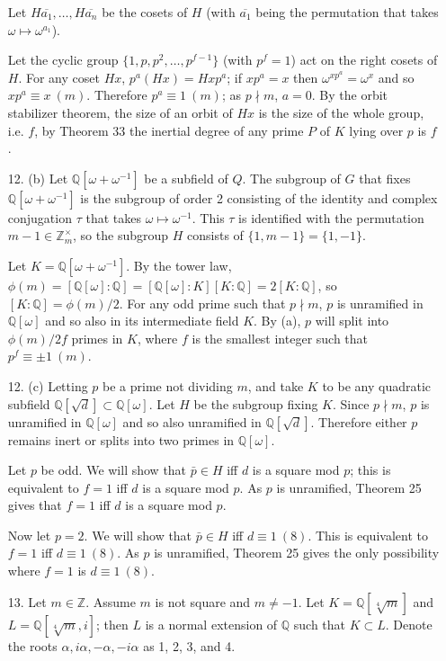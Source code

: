 \documentclass{article}
\newcommand{\w}[0]{\omega}
\newcommand{\Q}[0]{\mathbb{Q}}
\newcommand{\Z}[0]{\mathbb{Z}}
\newcommand{\modequiv}[3]{#1 \equiv #2\ (#3)}
\begin{document}
\begin{enumerate}
Let $H\overline{a_1}, \ldots, H\overline{a_n}$ be the cosets of $H$ (with $\overline{a_1}$ being the permutation that takes $\w \mapsto \w^{a_1}$).

Let the cyclic group $\{1, p, p^2, \ldots, p^{f-1} \}$ (with $p^{f} = 1$) act on the right cosets of $H$.  For any coset $Hx$, $p^{a}(Hx) = Hxp^{a}$; if $xp^{a} = x$ then $\w^{xp^{a}} = \w^{x}$ and so $\modequiv{xp^{a}}{x}{m}$.  Therefore $\modequiv{p^a}{1}{m}$; as $p \nmid m$, $a = 0$.  By the orbit stabilizer theorem, the size of an orbit of $Hx$ is the size of the whole group, i.e. $f$, by Theorem 33 the inertial degree of any prime $P$ of $K$ lying over $p$ is $f$.

\item [12. (b)] Let $\Q[\w + \w^{-1}]$ be a subfield of $Q$.  The subgroup of $G$ that fixes $\Q[\w + \w^{-1}]$ is the subgroup of order 2 consisting of the identity and complex conjugation $\tau$ that takes $\omega \mapsto \omega^{-1}$.  This $\tau$ is identified with the permutation $m - 1 \in \Z^{\times}_{m}$, so the subgroup $H$ consists of $\{1, m - 1 \} = \{1, -1 \}$.

Let $K = \Q[\w + \w^{-1}]$.  By the tower law, $\phi(m) = [\Q[\w] : \Q] = [\Q[\w] : K][K : \Q] = 2[K : \Q]$, so $[K : \Q] = \phi(m) / 2$.  For any odd prime such that $p \nmid m$, $p$ is unramified in $\Q[\w]$ and so also in its intermediate field $K$.  By (a), $p$ will split into $\phi(m) / 2f$ primes in $K$, where $f$ is the smallest integer such that $\modequiv{p^f}{\pm 1}{m}$.

\item [12. (c)] Letting $p$ be a prime not dividing $m$, and take $K$ to be any quadratic subfield $\Q[\sqrt{d}] \subset \Q[\w]$.  Let $H$ be the subgroup fixing $K$. Since $p \nmid m$, $p$ is unramified in $\Q[\w]$ and so also unramified in $\Q[\sqrt{d}]$.  Therefore either $p$ remains inert or splits into two primes in $\Q[\w]$.

Let $p$ be odd. We will show that $\bar{p} \in H$ iff $d$ is a square mod $p$; this is equivalent to $f = 1$ iff $d$ is a square mod $p$.  As $p$ is unramified, Theorem 25 gives that $f = 1$ iff $d$ is a square mod $p$.

Now let $p = 2$.  We will show that $\bar{p} \in H$ iff $\modequiv{d}{1}{8}$.  This is equivalent to $f = 1$ iff $\modequiv{d}{1}{8}$.  As $p$ is unramified, Theorem 25 gives the only possibility where $f = 1$ is $\modequiv{d}{1}{8}$.

\item [13.] Let $m \in \Z$.  Assume $m$ is not square and $m \neq -1$.  Let $K = \Q[\sqrt[4]{m}]$ and $L = \Q[\sqrt[4]{m}, i]$; then $L$ is a normal extension of $\Q$ such that $K \subset L$.  Denote the roots $\alpha, i\alpha, -\alpha, -i\alpha$ as 1, 2, 3, and 4.


\end{enumerate}
\end{document}
